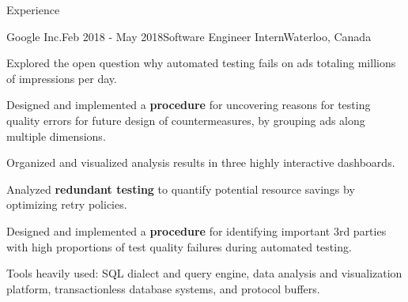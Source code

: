 \documentclass{resume} %
\begin{document}
\begin{rSection}{Experience}
\begin{rSubsection}{Google Inc.}{Feb 2018 - May 2018}{Software Engineer Intern}{Waterloo, Canada}
\item Explored the open question why automated testing fails on ads totaling millions of impressions per day.
\item Designed and implemented a \textbf{procedure} for uncovering reasons for testing quality errors for future design of countermeasures, by grouping ads along multiple dimensions.
\item Organized and visualized analysis results in three highly interactive dashboards.
\item Analyzed \textbf{redundant testing} to quantify potential resource savings by optimizing retry policies.
\item Designed and implemented a \textbf{procedure} for identifying important 3rd parties with high proportions of test quality failures during automated testing.
\item Tools heavily used: SQL dialect and query engine, data analysis and visualization platform, transactionless database systems, and protocol buffers.
\end{rSubsection}



\end{rSection}
\end{document}
